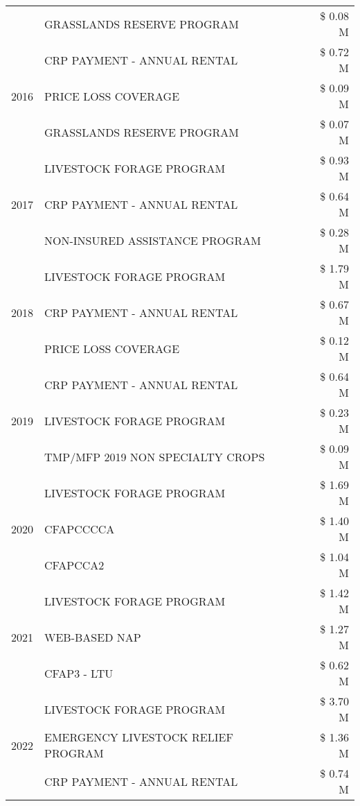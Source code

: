 \begin{tabular}{llr}
 & GRASSLANDS RESERVE PROGRAM & \$ 0.08 M \\
\cline{1-3}
\multirow[t]{3}{*}{2016} & CRP PAYMENT - ANNUAL RENTAL & \$ 0.72 M \\
 & PRICE LOSS COVERAGE & \$ 0.09 M \\
 & GRASSLANDS RESERVE PROGRAM & \$ 0.07 M \\
\cline{1-3}
\multirow[t]{3}{*}{2017} & LIVESTOCK FORAGE PROGRAM & \$ 0.93 M \\
 & CRP PAYMENT - ANNUAL RENTAL & \$ 0.64 M \\
 & NON-INSURED ASSISTANCE PROGRAM & \$ 0.28 M \\
\cline{1-3}
\multirow[t]{3}{*}{2018} & LIVESTOCK FORAGE PROGRAM & \$ 1.79 M \\
 & CRP PAYMENT - ANNUAL RENTAL & \$ 0.67 M \\
 & PRICE LOSS COVERAGE & \$ 0.12 M \\
\cline{1-3}
\multirow[t]{3}{*}{2019} & CRP PAYMENT - ANNUAL RENTAL & \$ 0.64 M \\
 & LIVESTOCK FORAGE PROGRAM & \$ 0.23 M \\
 & TMP/MFP 2019 NON SPECIALTY CROPS & \$ 0.09 M \\
\cline{1-3}
\multirow[t]{3}{*}{2020} & LIVESTOCK FORAGE PROGRAM & \$ 1.69 M \\
 & CFAPCCCCA & \$ 1.40 M \\
 & CFAPCCA2 & \$ 1.04 M \\
\cline{1-3}
\multirow[t]{3}{*}{2021} & LIVESTOCK FORAGE PROGRAM & \$ 1.42 M \\
 & WEB-BASED NAP & \$ 1.27 M \\
 & CFAP3 - LTU & \$ 0.62 M \\
\cline{1-3}
\multirow[t]{3}{*}{2022} & LIVESTOCK FORAGE PROGRAM & \$ 3.70 M \\
 & EMERGENCY LIVESTOCK RELIEF PROGRAM & \$ 1.36 M \\
 & CRP PAYMENT - ANNUAL RENTAL & \$ 0.74 M \\
\cline{1-3}
\bottomrule
\end{tabular}
